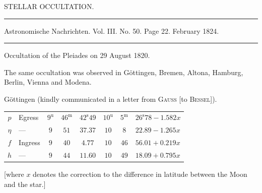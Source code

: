 \clearpage
{}
\hypertarget{native-453-sternbedeckung}{}
\begin{center}
{\large STELLAR OCCULTATION.}

\rule{0.75\linewidth}{0.4pt}

Astronomische Nachrichten. Vol. III. No. 50. Page 22. February 1824.

\rule{0.75\linewidth}{0.4pt}
\end{center}

\begin{center}
Occultation of the Pleiades on 29 August 1820.
\end{center}

The same occultation was observed in Göttingen, Bremen, Altona, Hamburg, Berlin, Vienna and Modena.

\begin{center}
Göttingen (kindly communicated in a letter from \textsc{Gauss} [to \textsc{Bessel}]).

\begingroup\small\setlength{\tabcolsep}{4pt}
\begin{tabular}{c l c c c | c c l}
$p$ & Egress & $9^{\mathrm u}$ & $46^{\mathrm m}$ & $42^{\mathrm s}49$ & $10^{\mathrm u}$ & $5^{\mathrm m}$ & $26^{\mathrm s}78 - 1.582x$ \\
$\eta$ & --- & $9$ & $51$ & $37.37$ & $10$ & $8$ & $22.89 - 1.265x$ \\
$f$ & Ingress & $9$ & $40$ & $4.77$ & $10$ & $46$ & $56.01 + 0.219x$ \\
$h$ & --- & $9$ & $44$ & $11.60$ & $10$ & $49$ & $18.09 + 0.795x$ \\
\end{tabular}
\endgroup
\end{center}

[where $x$ denotes the correction to the difference in latitude between the Moon and the star.]

